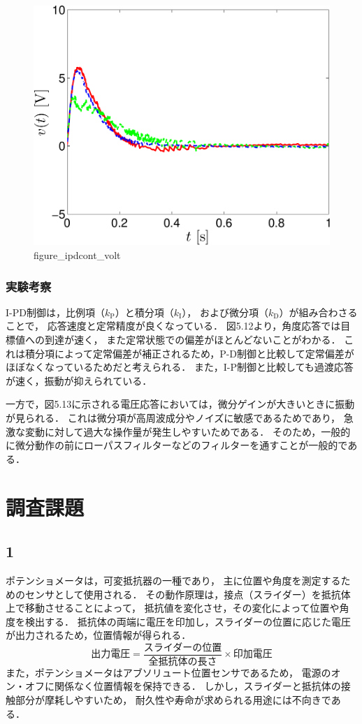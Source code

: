 \begin{figure}[h]
  \centering
  \includegraphics[scale=0.5]{sozai/figure_ipdcont_volt-crop.pdf}
  \caption{figure\_ipdcont\_volt}
\end{figure}

\newpage

\subsubsection{実験考察}
I-PD制御は，比例項（\( k_{\mathrm{P}} \)）と積分項（\( k_{\mathrm{I}} \)），
および微分項（\( k_{\mathrm{D}} \)）が組み合わさることで，
応答速度と定常精度が良くなっている．
図5.12より，角度応答では目標値への到達が速く，
また定常状態での偏差がほとんどないことがわかる．
これは積分項によって定常偏差が補正されるため，P-D制御と比較して定常偏差がほぼなくなっているためだと考えられる．
また，I-P制御と比較しても過渡応答が速く，振動が抑えられている．

一方で，図5.13に示される電圧応答においては，微分ゲインが大きいときに振動が見られる．
これは微分項が高周波成分やノイズに敏感であるためであり，
急激な変動に対して過大な操作量が発生しやすいためである．
そのため，一般的に微分動作の前にローパスフィルターなどのフィルターを通すことが一般的である．


\section{調査課題}

\subsection*{1}
ポテンショメータは，可変抵抗器の一種であり，
主に位置や角度を測定するためのセンサとして使用される．
その動作原理は，接点（スライダー）を抵抗体上で移動させることによって，
抵抗値を変化させ，その変化によって位置や角度を検出する．
抵抗体の両端に電圧を印加し，スライダーの位置に応じた電圧が出力されるため，位置情報が得られる．
\[
  \text{出力電圧} = \frac{\text{スライダーの位置}}{\text{全抵抗体の長さ}} \times \text{印加電圧}
\]
また，ポテンショメータはアブソリュート位置センサであるため，
電源のオン・オフに関係なく位置情報を保持できる．
しかし，スライダーと抵抗体の接触部分が摩耗しやすいため，
耐久性や寿命が求められる用途には不向きである．

